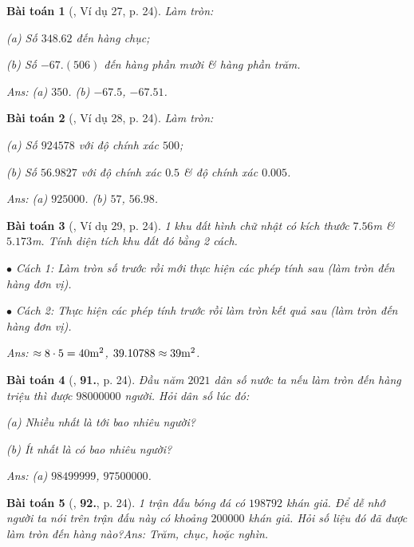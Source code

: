 \documentclass{article}
\numberwithin{equation}{section}
\newtheorem{baitoan}{Bài toán}
\begin{document}
\begin{baitoan}[\cite{Tuyen_Toan_7}, Ví dụ 27, p. 24]
	Làm tròn:
	\begin{enumerate*}
		\item[(a)] Số $348.62$ đến hàng chục;
		\item[(b)] Số $-67.(506)$ đến hàng phần mười \& hàng phần trăm.
	\end{enumerate*}\hfill\textsf{Ans:} (a) $350$. (b) $-67.5$, $-67.51$.
\end{baitoan}

\begin{baitoan}[\cite{Tuyen_Toan_7}, Ví dụ 28, p. 24]
	Làm tròn:
	\begin{enumerate*}
		\item[(a)] Số $924578$ với độ chính xác $500$;
		\item[(b)] Số $56.9827$ với độ chính xác $0.5$ \& độ chính xác $0.005$.
	\end{enumerate*}\hfill\textsf{Ans:} (a) $925000$. (b) $57$, $56.98$.
\end{baitoan}

\begin{baitoan}[\cite{Tuyen_Toan_7}, Ví dụ 29, p. 24]
	1 khu đất hình chữ nhật có kích thước $7.56$\emph{m} \& $5.173$\emph{m}. Tính diện tích khu đất đó bằng 2 cách.
	\begin{enumerate*}
		\item[$\bullet$] Cách 1: Làm tròn số trước rồi mới thực hiện các phép tính sau (làm tròn đến hàng đơn vị).
		\item[$\bullet$] Cách 2: Thực hiện các phép tính trước rồi làm tròn kết quả sau (làm tròn đến hàng đơn vị).
	\end{enumerate*}\hfill\textsf{Ans:} $\approx\rm 8\cdot 5 = 40m^2$, $\rm39.10788\approx 39m^2$.
\end{baitoan}

\begin{baitoan}[\cite{Tuyen_Toan_7}, \textbf{91.}, p. 24]
	Đầu năm $2021$ dân số nước ta nếu làm tròn đến hàng triệu thì được $98000000$ người. Hỏi dân số lúc đó:
	\begin{enumerate*}
		\item[(a)] Nhiều nhất là tới bao nhiêu người?
		\item[(b)] Ít nhất là có bao nhiêu người? 
	\end{enumerate*}\hfill\textsf{Ans:} (a) $98499999$, $97500000$.
\end{baitoan}

\begin{baitoan}[\cite{Tuyen_Toan_7}, \textbf{92.}, p. 24]
	1 trận đấu bóng đá có $198 792$ khán giả. Để dễ nhớ người ta nói trên trận đấu này có khoảng $200000$ khán giả. Hỏi số liệu đó đã được làm tròn đến hàng nào?\hfill\textsf{Ans:} Trăm, chục, hoặc nghìn.
\end{baitoan}
\end{document}

